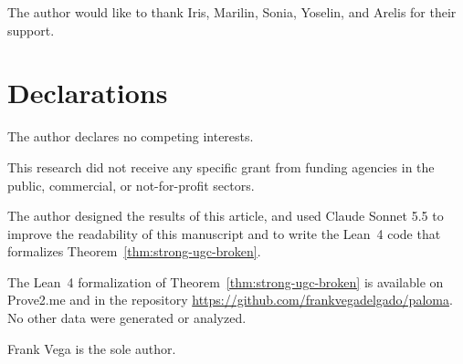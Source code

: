 \documentclass[pdflatex,sn-mathphys-num]{sn-jnl}%
\theoremstyle{thmstyleone}%
\theoremstyle{thmstyletwo}%
\theoremstyle{thmstylethree}%
\begin{document}
\backmatter


The author would like to thank Iris, Marilin, Sonia, Yoselin, and Arelis for their support.

\section*{Declarations}


The author declares no competing interests.


This research did not receive any specific grant from funding agencies in the public, commercial, or not-for-profit sectors.


The author designed the results of this article, and used Claude Sonnet 5.5 to improve the readability of this manuscript and to write the Lean~4 code that formalizes Theorem~\ref{thm:strong-ugc-broken}.


The Lean~4 formalization of Theorem~\ref{thm:strong-ugc-broken} is available on Prove2.me \cite{VegaProve2MeStrongUgcBroken2026} and in the repository \url{https://github.com/frankvegadelgado/paloma}. No other data were generated or analyzed.


Frank Vega is the sole author.


\end{document}
